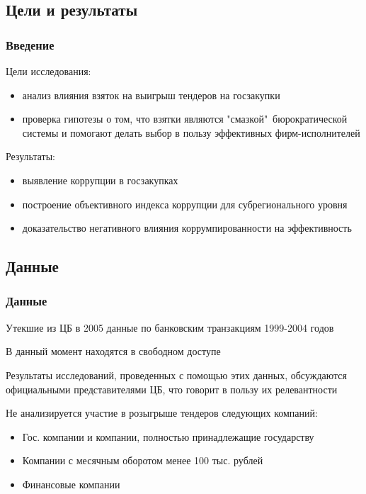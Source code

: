 \subsection{Цели и результаты}

\begin{frame}

\frametitle{Введение}
Цели исследования:\\ 

\begin{itemize}
\item анализ влияния взяток на выигрыш тендеров на госзакупки

\item проверка гипотезы о том, 
что взятки являются "смазкой"\ бюрократической системы и помогают делать выбор в пользу
эффективных фирм-исполнителей
\end{itemize}

\vspace{5mm}

Результаты:
\begin{itemize}

\item выявление коррупции в госзакупках

\item построение объективного индекса
коррупции для субрегионального уровня

\item доказательство негативного влияния коррумпированности на
эффективность

\end{itemize}

\end{frame}



\subsection{Данные}

\begin{frame}

\frametitle{Данные}
Утекшие из ЦБ в 2005 данные по банковским транзакциям 1999-2004 годов
\vspace{3mm}

В данный момент находятся в свободном доступе
\vspace{3mm}

Результаты исследований, проведенных с помощью этих данных, 
обсуждаются официальными представителями ЦБ,
что говорит в пользу их релевантности
\vspace{3mm}

Не анализируется участие в розыгрыше тендеров следующих компаний:
\begin{itemize}
\item Гос. компании и компании, полностью принадлежащие государству
\item Компании с месячным оборотом менее 100 тыс. рублей
\item Финансовые компании
\end{itemize}

\end{frame}